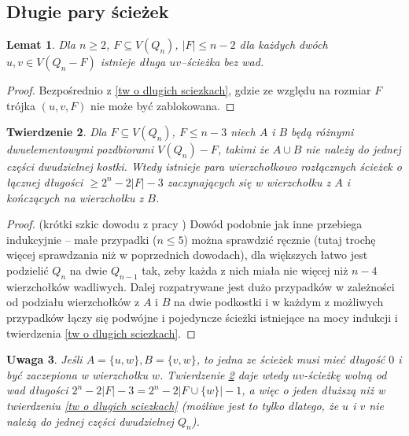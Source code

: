 \documentclass{pracamgr}
\newtheorem{theorem}{Twierdzenie}
\newtheorem{lemma}[theorem]{Lemat}
\newtheorem{remark}[theorem]{Uwaga}
\begin{document}
   \subsection{Długie pary ścieżek}
    \begin{lemma}\label{zawsze dlugie sciezki}
     Dla $n\ge2$, $F\subseteq V(Q_n)$, $|F|\le n-2$ dla każdych dwóch $u,v\in V(Q_n-F)$ istnieje długa $uv$--ścieżka bez wad.
    \end{lemma}
    \begin{proof}
     Bezpośrednio z \ref{tw o dlugich sciezkach}, gdzie ze względu na rozmiar $F$ trójka $(u,v,F)$ nie może być zablokowana.
    \end{proof}
    \begin{theorem}\label{pary sciezek}
     Dla $F\subseteq V(Q_n)$, $F\le n-3$ niech $A$ i $B$ będą różnymi dwuelementowymi pozdbiorami $V(Q_n)-F$, takimi że $A\cup B$ nie należy do
     jednej części dwudzielnej kostki. Wtedy istnieje para wierzchołkowo rozłącznych
     ścieżek o łącznej długości $\ge 2^n-2|F|-3$ zaczynających się w wierzchołku z $A$ i kończących na wierzchołku z $B$.
    \end{theorem}
    \begin{proof}
    (krótki szkic dowodu z pracy \cite{FG2})\newline
     Dowód podobnie jak inne przebiega indukcyjnie -- małe przypadki ($n\le 5$) można sprawdzić ręcznie (tutaj trochę więcej sprawdzania niż w poprzednich dowodach),
     dla większych łatwo jest podzielić $Q_n$ na dwie $Q_{n-1}$ tak, zeby każda z nich miała nie więcej niż $n-4$ wierzchołków wadliwych.
     Dalej rozpatrywane jest dużo przypadków w zależności od podziału wierzchołków z $A$ i $B$ na dwie podkostki i w każdym z możliwych przypadków łączy się
     podwójne i pojedyncze ścieżki istniejące na mocy indukcji i twierdzenia \ref{tw o dlugich sciezkach}.
    \end{proof}
    \begin{remark}\label{a cap B=(u)}
     Jeśli $A=\{u,w\}, B=\{v,w\}$, to jedna ze ścieżek musi mieć długość $0$ i być zaczepiona w wierzchołku $w$.
     Twierdzenie \ref{pary sciezek} daje wtedy $uv$-ścieżkę
     wolną od wad długości $2^n-2|F|-3=2^n-2|F\cup\{w\}|-1$, a więc o jeden dłuższą niż w twierdzeniu \ref{tw o dlugich sciezkach}
     (możliwe jest to tylko dlatego, że $u$ i $v$ nie należą do jednej części dwudzielnej $Q_n$).
    \end{remark}
\end{document}
